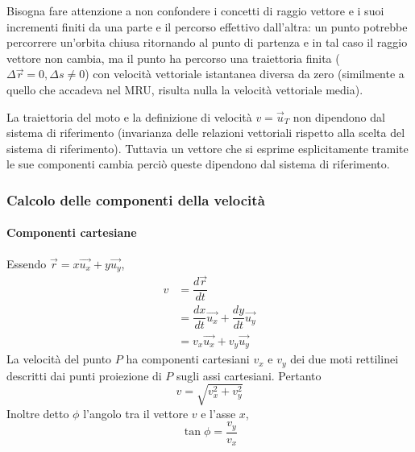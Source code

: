 \documentclass[class=book, crop=false, oneside, 12pt]{standalone}
\begin{document}
  Bisogna fare attenzione a non confondere i concetti di raggio vettore e i suoi incrementi finiti da una parte e il percorso effettivo dall'altra: un punto potrebbe percorrere un'orbita chiusa ritornando al punto di partenza e in tal caso il raggio vettore non cambia, ma il punto ha percorso una traiettoria finita (\(\Delta \overrightarrow{r} = 0, \Delta s \neq 0\)) con velocità vettoriale istantanea diversa da zero (similmente a quello che accadeva nel MRU, risulta nulla la velocità vettoriale media).

  La traiettoria del moto e la definizione di velocità \(v = \overrightarrow{u}_T\) non dipendono dal sistema di riferimento (invarianza delle relazioni vettoriali rispetto alla scelta del sistema di riferimento).
  Tuttavia un vettore che si esprime esplicitamente tramite le sue componenti cambia perciò queste dipendono dal sistema di riferimento.
		\subsubsection{Calcolo delle componenti della velocit\`a}
			\paragraph{Componenti cartesiane}
      Essendo $\overrightarrow{r}=x\overrightarrow{u_x}+y\overrightarrow{u_y}$,
			\begin{align*}
        v &=\dfrac{d\overrightarrow{r}}{dt}\\
          &=\dfrac{dx}{dt}\overrightarrow{u_x}+\dfrac{dy}{dt}\overrightarrow{u_y}\\
          &=v_x\overrightarrow{u_x} + v_y\overrightarrow{u_y}
			\end{align*}
			La velocit\`a del punto $P$ ha componenti cartesiani $v_x$ e $v_y$ dei due moti rettilinei descritti dai punti proiezione di $P$ sugli assi cartesiani.
			Pertanto
			$$v=\sqrt{v^2_x+v_y^2}$$
			Inoltre detto $\phi$ l'angolo tra il vettore $v$ e l'asse $x$,
			$$\tan\phi = \dfrac{v_y}{v_x}$$
\end{document}
